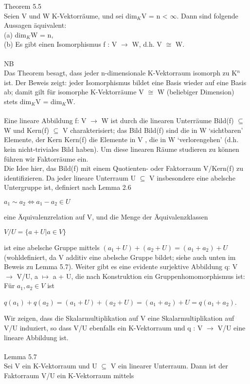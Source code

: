 \documentclass[fontsize=10pt]{scrartcl}
\begin{document}
Theorem 5.5\\
Seien V und W K-Vektorräume, und sei dim$_K$V = n < $\infty$. Dann sind folgende Aussagen äquivalent:\\
(a) dim$_K$W = n, \\
(b) Es gibt einen Isomorphismus f : V $\to$ W, d.h. V $\cong$ W.\\
\\
NB\\
Das Theorem besagt, dass jeder n-dimensionale K-Vektorraum isomorph zu K$^n$ ist. Der Beweis zeigt: jeder Isomorphismus bildet eine Basis wieder auf eine Basis ab; damit gilt für isomorphe K-Vektorräume V $\cong$ W (beliebiger Dimension) stets dim$_K$V = dim$_K$W.\\
\\
Eine lineare Abbildung f: V $\to$ W ist durch die linearen Unterräume Bild(f) $\subseteq$ W und Kern(f) $\subseteq$ V charakterisiert; das Bild Bild(f) sind die in W ‘sichtbaren’ Elemente, der Kern Kern(f) die Elemente in V , die in W ‘verlorengehen’ (d.h. kein nicht-triviales Bild haben). Um diese linearen Räume studieren zu können führen wir Faktorräume ein.\\
Die Idee hier, das Bild(f) mit einem Quotienten- oder Faktorraum V/Kern(f) zu identifizieren. Da jeder lineare Unterraum U $\subseteq$ V insbesondere eine abelsche Untergruppe ist, definiert nach Lemma 2.6
\begin{center}
$a_1 \sim a_2 \Leftrightarrow a_1 - a_2 \in U$
\end{center}
eine Äquivalenzrelation auf V, und die Menge der Äquivalenzklassen
\begin{center}
$V /U = \{a + U | a \in V \}$
\end{center}
ist eine abelsche Gruppe mittels $(a_1 + U) + (a_2 + U) = (a_1 + a_2) + U$ (wohldefiniert, da V additiv eine abelsche Gruppe bildet; siehe auch unten im Beweis zu Lemma 5.7). Weiter gibt es eine evidente surjektive Abbildung q: V $\to$ V/U, a $\mapsto$ a + U, die nach Konstruktion ein Gruppenhomomorphismus ist: Für $a_1, a_2 \in V$ ist
\begin{center}
$q(a_1)+q(a_2)=(a_1 +U)+(a_2 +U)=(a_1 +a_2)+U =q(a_1 +a_2)$.
\end{center}
Wir zeigen, dass die Skalarmultiplikation auf V eine Skalarmultiplikation auf V/U induziert, so dass V/U ebenfalls ein K-Vektorraum und q : V $\to$ V/U eine lineare Abbildung ist.\\
\\
Lemma 5.7\\
Sei V ein K-Vektorraum und U $\subseteq$ V ein linearer Unterraum. Dann ist der Faktorraum V/U ein K-Vektorraum mittels
\end{document}
